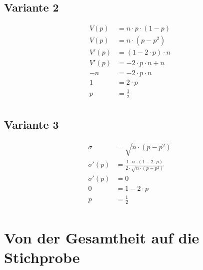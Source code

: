\documentclass[a4paper,12pt]{article}
\begin{document}
\subsection*{Variante 2}
\begin{equation*}
\begin{split}
V(p) & = n \cdot p \cdot (1 - p)\\
V(p) & = n \cdot (p - p^{2})\\
V'(p) & = (1-2 \cdot p) \cdot n\\
V'(p) & = -2 \cdot p \cdot n + n\\
-n & = -2\cdot p \cdot n\\
1 & = 2 \cdot p\\
p & = \frac{1}{2}\\
\end{split}
\end{equation*}
\subsection*{Variante 3}
\begin{equation*}
\begin{split}
\sigma & = \sqrt{n \cdot (p - p^{2})}\\
\sigma'(p) & = \frac{1 \cdot n \cdot (1 - 2 \cdot p)}{2 \cdot \sqrt{n \cdot (p - p^{2})}}\\
\sigma'(p) & = 0\\
0 & = 1 - 2 \cdot p\\
p & = \frac{1}{2}\\
\end{split}
\end{equation*}
\pagebreak
\section{Von der Gesamtheit auf die Stichprobe}
\end{document}
